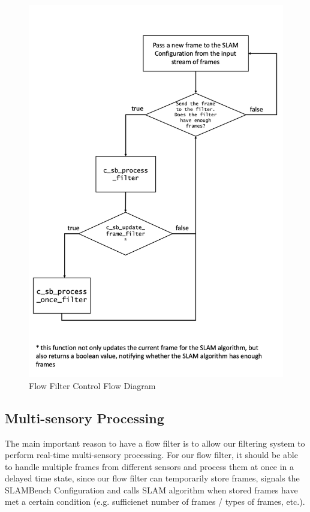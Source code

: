 \begin{figure}[!htbp]
	\caption{\label{fig:controlflow}Flow Filter Control Flow Diagram}
	\includegraphics[width=12cm]{figures/control-flow-diagram.png}
	\centering
\end{figure}

\subsection{Multi-sensory Processing}

The main important reason to have a flow filter is to allow our filtering system to perform real-time multi-sensory processing. 
For our flow filter, it should be able to handle multiple frames from different sensors and process them at once in a delayed time state, since our flow filter can temporarily store frames, signals the SLAMBench Configuration and calls SLAM algorithm when stored frames have met a certain condition (e.g. sufficienet number of frames / types of frames, etc.). 

